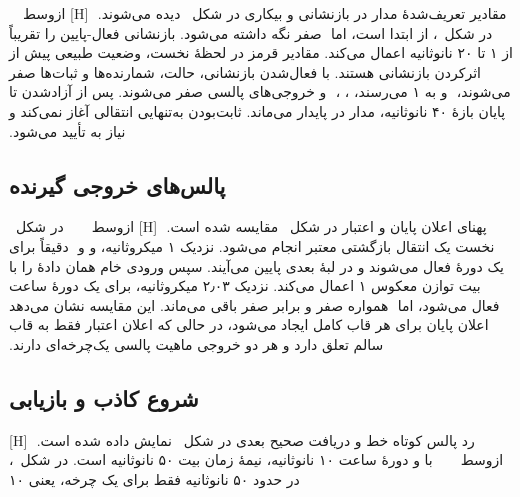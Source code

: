 ‫
‫مقادیر تعریف‌شدهٔ مدار در بازنشانی و بیکاری در شکل~ دیده
‫می‌شوند.
‫
‫[H]
‫‌ازوسط
‫
‫
‫
‫
‫
‫در شکل~،  از ابتدا  است، اما
‫ صفر نگه داشته می‌شود.  بازنشانی فعال-پایین را تقریباً از ۱ تا
‫۲۰ نانوثانیه اعمال می‌کند. مقادیر قرمز  در لحظهٔ نخست، وضعیت طبیعی پیش از
‫اثرکردن بازنشانی هستند. با فعال‌شدن بازنشانی، حالت، شمارنده‌ها و ثبات‌ها صفر می‌شوند،
‫ و  به ۱ می‌رسند، ، ،
‫ و خروجی‌های پالسی صفر می‌شوند. پس از آزادشدن  تا پایان بازهٔ
‫۴۰ نانوثانیه، مدار در  پایدار می‌ماند. ثابت‌بودن  به‌تنهایی
‫انتقالی آغاز نمی‌کند و نیاز به  تأیید می‌شود.
‫
‫
‫\subsection{پالس‌های خروجی گیرنده}
‫
‫پهنای اعلان پایان و اعتبار در شکل~ مقایسه شده است.
‫
‫[H]
‫‌ازوسط
‫
‫
‫
‫
‫
‫در شکل~ نخست یک انتقال بازگشتی معتبر  انجام می‌شود.
‫نزدیک ۱ میکروثانیه،  و  و
‫ دقیقاً برای یک دورهٔ  فعال می‌شوند و در لبهٔ بعدی پایین
‫می‌آیند. سپس ورودی خام همان دادهٔ  را با بیت توازن معکوس ۱ اعمال می‌کند. نزدیک
‫۲٫۰۳ میکروثانیه،  برای یک دورهٔ ساعت فعال می‌شود، اما
‫ همواره صفر و  برابر صفر باقی می‌ماند.
‫این مقایسه نشان می‌دهد اعلان پایان برای هر قاب کامل ایجاد می‌شود، در حالی که اعلان اعتبار
‫فقط به قاب سالم تعلق دارد و هر دو خروجی ماهیت پالسی یک‌چرخه‌ای دارند.
‫
‫
‫\subsection{شروع کاذب و بازیابی}
‫
‫رد پالس کوتاه خط و دریافت صحیح بعدی در شکل~ نمایش داده شده است.
‫
‫[H]
‫‌ازوسط
‫
‫
‫
‫
‫
‫با  و دورهٔ ساعت ۱۰ نانوثانیه، نیمهٔ زمان بیت ۵۰ نانوثانیه است. در
‫شکل~،  در حدود ۵۰ نانوثانیه فقط برای یک چرخه، یعنی ۱۰
